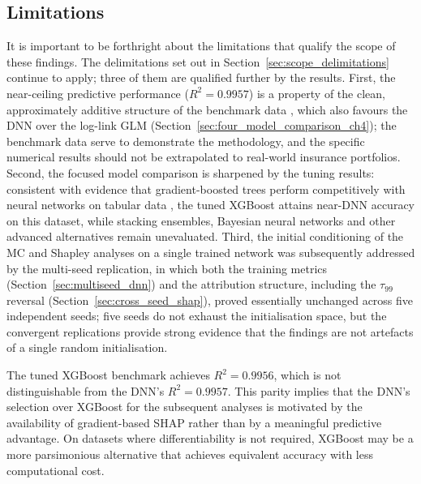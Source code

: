 
\subsection{Limitations}
\label{sec:limitations_conclusion}

It is important to be forthright about the limitations that qualify the
scope of these findings.  The delimitations set out in
Section~\ref{sec:scope_delimitations} continue to apply; three of them
are qualified further by the results.  First, the near-ceiling
predictive performance ($R^2 = 0.9957$) is a property of the clean,
approximately additive structure of the benchmark data
\citep{kaggleInsuranceDataML}, which also favours the DNN over
the log-link GLM
(Section~\ref{sec:four_model_comparison_ch4}); the benchmark data serve
to demonstrate the methodology, and the specific numerical results
should not be extrapolated to real-world insurance portfolios.  Second,
the focused model comparison is sharpened by the tuning results:
consistent with evidence that gradient-boosted trees perform
competitively with neural networks on tabular data
\citep{richman2021ai}, the tuned XGBoost attains near-DNN
accuracy on this dataset, while stacking ensembles, Bayesian neural
networks and other advanced alternatives remain unevaluated.  Third,
the initial conditioning of the MC and Shapley analyses on a
single trained network was subsequently addressed by the multi-seed
replication, in which both the training metrics
(Section~\ref{sec:multiseed_dnn}) and the attribution structure,
including the $\tau_{99}$ reversal
(Section~\ref{sec:cross_seed_shap}), proved essentially unchanged
across five independent seeds; five seeds do not exhaust the
initialisation space, but the convergent replications provide strong
evidence that the findings are not artefacts of a single random
initialisation.

The tuned XGBoost benchmark achieves $R^2 = 0.9956$, which is not
distinguishable from the DNN's $R^2 = 0.9957$.  This
parity implies that the DNN's selection over XGBoost for the subsequent
analyses is motivated by the availability of gradient-based SHAP rather
than by a meaningful predictive advantage.  On datasets where
differentiability is not required, XGBoost may be a more parsimonious
alternative that achieves equivalent accuracy with less computational
cost.

